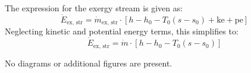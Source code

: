 The expression for the exergy stream is given as:  
\[
\dot{E}_{\text{ex, str}} = \dot{m}_{\text{ex, str}} \cdot \left[ h - h_0 - T_0 (s - s_0) + \text{ke} + \text{pe} \right]
\]  
Neglecting kinetic and potential energy terms, this simplifies to:  
\[
\dot{E}_{\text{ex, str}} = \dot{m} \cdot \left[ h - h_0 - T_0 (s - s_0) \right]
\]  

No diagrams or additional figures are present.